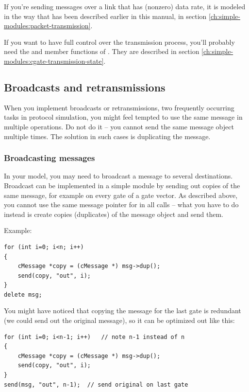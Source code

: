 If you're sending messages over a link that has (nonzero) data rate,
it is modeled in the way that has been described earlier in this
manual, in section \ref{ch:simple-modules:packet-transmission}.

If you want to have full control over the transmission process,
you'll probably need the  and 
member functions of . They are described in section
\ref{ch:simple-modules:cgate-transmission-state}.



\subsection{Broadcasts and retransmissions}

When you implement broadcasts or retransmissions, two frequently
occurring tasks in protocol simulation, you might feel tempted
to use the same message in multiple  operations.
Do not do it -- you cannot send the same message object multiple times.
The solution in such cases is duplicating the message.

\subsubsection{Broadcasting messages}

In your model, you may need to broadcast a message to several destinations.
Broadcast can be implemented in a simple module by sending out copies
of the same message, for example on every gate of a gate vector.
As described above, you cannot use the same message pointer for
in all  calls -- what you have to do instead is
create copies (duplicates) of the message object and send them.

Example:

\begin{verbatim}
for (int i=0; i<n; i++)
{
    cMessage *copy = (cMessage *) msg->dup();
    send(copy, "out", i);
}
delete msg;
\end{verbatim}

You might have noticed that copying the message for the last gate is
redundant (we could send out the original message),
so it can be optimized out like this:

\begin{verbatim}
for (int i=0; i<n-1; i++)   // note n-1 instead of n
{
    cMessage *copy = (cMessage *) msg->dup();
    send(copy, "out", i);
}
send(msg, "out", n-1);  // send original on last gate
\end{verbatim}


